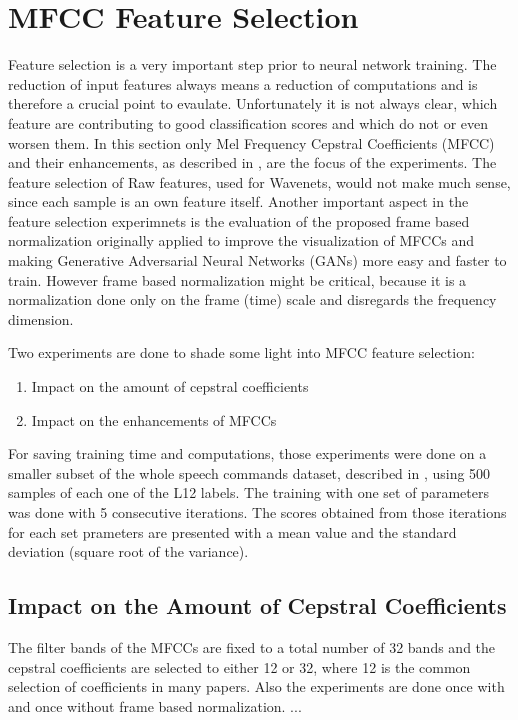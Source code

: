 
\section{MFCC Feature Selection}\label{sec:exp_fs}
\thesisStateNotReady
Feature selection is a very important step prior to neural network training.
The reduction of input features always means a reduction of computations and is therefore a crucial point to evaulate.
Unfortunately it is not always clear, which feature are contributing to good classification scores and which do not or even worsen them.
In this section only Mel Frequency Cepstral Coefficients (MFCC) and their enhancements, as described in , are the focus of the experiments.
The feature selection of Raw features, used for Wavenets, would not make much sense, since each sample is an own feature itself.
Another important aspect in the feature selection experimnets is the evaluation of the proposed frame based normalization  originally applied to improve the visualization of MFCCs and making Generative Adversarial Neural Networks (GANs) more easy and faster to train.
However frame based normalization might be critical, because it is a normalization done only on the frame (time) scale and disregards the frequency dimension.

Two experiments are done to shade some light into MFCC feature selection:
\begin{enumerate}
    \item Impact on the amount of cepstral coefficients
    \item Impact on the enhancements of MFCCs
\end{enumerate}
For saving training time and computations, those experiments were done on a smaller subset of the whole speech commands dataset, described in , using 500 samples of each one of the L12 labels.
The training with one set of parameters was done with 5 consecutive iterations.
The scores obtained from those iterations for each set prameters are presented with a mean value and the standard deviation (square root of the variance).



\subsection{Impact on the Amount of Cepstral Coefficients}
The filter bands of the MFCCs are fixed to a total number of 32 bands and the cepstral coefficients are selected to either 12 or 32, where 12 is the common selection of coefficients in many papers.
Also the experiments are done once with and once without frame based normalization.
...


